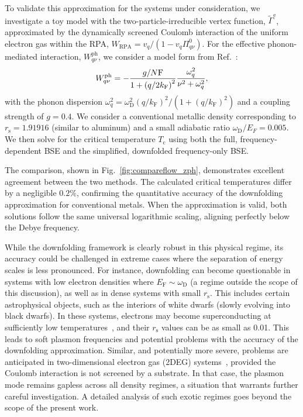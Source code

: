 \documentclass[%
 reprint,
superscriptaddress,
 amsmath,amssymb,
 aps,
prx,
]{revtex4-2}
\newcommand{\txc}{\text{c}}
\newcommand{\txe}{\text{e}}
\newcommand{\txs}{\text{s}}
\newcommand{\txD}{\text{D}}
\newcommand{\txF}{\text{F}}
\newcommand{\txph}{\text{ph}}
\newcommand{\txRPA}{\text{RPA}}
\begin{document}
To validate this approximation for the systems under consideration, we investigate a toy model with the two-particle-irreducible vertex function, $\tilde{\Gamma}^\txe$, approximated by the dynamically screened Coulomb interaction of the uniform electron gas within the RPA, $W_\txRPA = v_q/(1 - v_q \Pi^0_{q\nu})$. For the effective phonon-mediated interaction, $W^{\txph}_{q\nu}$, we consider a model form from Ref.~\cite{23tao}:
\begin{equation}
\label{eq:elph}
W^{\rm ph}_{q\nu} = -\frac{g /N\txF}{1+{(q/2k_\txF)}^2}\frac{\omega_q^2}{\nu^2+\omega_q^2} ,
\end{equation}
with the phonon dispersion $\omega_q^2 = \omega_\txD^2(q/ k_\txF)^2 / (1 + (q/ k_\txF)^2)$ and a coupling strength of $g=0.4$. We consider a conventional metallic density corresponding to $r_\txs = 1.91916$ (similar to aluminum) and a small adiabatic ratio $\omega_\txD/E_F=0.005$. We then solve for the critical temperature $T_\txc$ using both the full, frequency-dependent BSE and the simplified, downfolded frequency-only BSE.

The comparison, shown in Fig.~\ref{fig:compareflow_zph}, demonstrates excellent agreement between the two methods. The calculated critical temperatures differ by a negligible $0.2\%$, confirming the quantitative accuracy of the downfolding approximation for conventional metals. When the approximation is valid, both solutions follow the same universal logarithmic scaling, aligning perfectly below the Debye frequency.

While the downfolding framework is clearly robust in this physical regime, its accuracy could be challenged in extreme cases where the separation of energy scales is less pronounced. For instance, downfolding can become questionable in systems with low electron densities where $E_\txF\sim\omega_\txD$ (a regime outside the scope of this discussion), as well as in dense systems with small $r_\txs$. This includes certain astrophysical objects, such as the interiors of white dwarfs (slowly evolving into black dwarfs). In these systems, electrons may become superconducting at sufficiently low temperatures~\cite{ginzburg_superconductivity_1968, trubnikov1968white}, and their $r_\txs$ values can be as small as 0.01. This leads to soft plasmon frequencies and potential problems with the accuracy of the downfolding approximation. Similar, and potentially more severe, problems are anticipated in two-dimensional electron gas (2DEG) systems~\cite{katsnelson2023screening}, provided the Coulomb interaction is not screened by a substrate. In that case, the plasmon mode remains gapless across all density regimes, a situation that warrants further careful investigation. A detailed analysis of such exotic regimes goes beyond the scope of the present work. 
\end{document}
